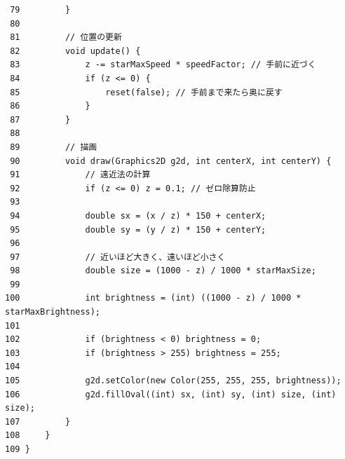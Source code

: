 \documentclass[11pt,a4j]{jarticle}
\begin{document}
\begin{small}
\begin{verbatim}
 79         }
 80 
 81         // 位置の更新
 82         void update() {
 83             z -= starMaxSpeed * speedFactor; // 手前に近づく
 84             if (z <= 0) {
 85                 reset(false); // 手前まで来たら奥に戻す
 86             }
 87         }
 88 
 89         // 描画
 90         void draw(Graphics2D g2d, int centerX, int centerY) {
 91             // 遠近法の計算
 92             if (z <= 0) z = 0.1; // ゼロ除算防止
 93             
 94             double sx = (x / z) * 150 + centerX;
 95             double sy = (y / z) * 150 + centerY;
 96 
 97             // 近いほど大きく、遠いほど小さく
 98             double size = (1000 - z) / 1000 * starMaxSize; 
 99 
100             int brightness = (int) ((1000 - z) / 1000 * starMaxBrightness);
101 
102             if (brightness < 0) brightness = 0;
103             if (brightness > 255) brightness = 255;
104             
105             g2d.setColor(new Color(255, 255, 255, brightness));
106             g2d.fillOval((int) sx, (int) sy, (int) size, (int) size);
107         }
108     }
109 }
\end{verbatim}
\end{small}
\end{document}

